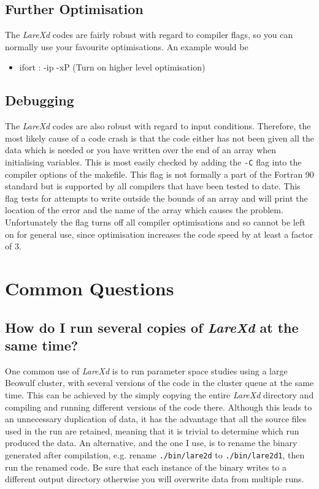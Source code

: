 \documentclass[11pt]{article}
\begin{document}
\subsection{Further Optimisation}
The {\it LareXd} codes are fairly robust with regard to compiler flags, so you can normally use your favourite optimisations. An example would be
\begin{itemize}
\item ifort : -ip -xP (Turn on higher level optimisation)
\end{itemize}
\subsection{Debugging}
The {\it LareXd} codes are also robust with regard to input conditions. Therefore, the most likely cause of a code crash is that the code either has not been given all the data which is needed or you have written over the end of an array when initialising variables. This is most easily checked by adding the \texttt{-C} flag into the compiler options of the makefile. This flag is not formally a part of the Fortran 90 standard but is supported by all compilers that have been tested to date. This flag tests for attempts to write outside the bounds of an array and will print the location of the error and the name of the array which causes the problem. Unfortunately the flag turns off all compiler optimisations and so cannot be left on for general use, since optimisation increases the code speed by at least a factor of 3.

\section{Common Questions}
\subsection*{How do I run several copies of {\it LareXd} at the same time?}
One common use of {\it LareXd} is to run parameter space studies using a large
Beowulf cluster, with several versions of the code in the cluster queue at the
same time. This can be achieved by the simply copying the entire {\it
  LareXd} directory and compiling and running different versions of the code
there. Although this leads to an unnecessary duplication of data, it has the
advantage that all the source files used in the run are retained, meaning that
it is trivial to determine which run produced the data. An alternative, and the one I use, is to rename the binary generated after compilation, e.g. rename {\tt ./bin/lare2d} to {\tt ./bin/lare2d1}, then run the renamed code. Be sure that each instance of the binary writes to a different output directory otherwise you will overwrite data from multiple runs.
\end{document}

